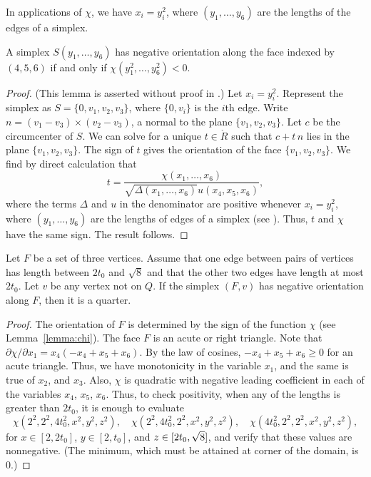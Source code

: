 In applications of $\chi$, we have $x_i = y_i^2$, where
$(y_1,\ldots,y_6)$ are the lengths of the edges of a simplex.

\begin{lemma} \label{lemma:chi}
A  simplex $S(y_1,\ldots,y_6)$ has negative
orientation along the face indexed by $(4,5,6)$ if and only if
    $\chi(y_1^2,\ldots,y_6^2)<0$.
\end{lemma}

\begin{proof} (This lemma is asserted without proof in \cite{part1}.)
Let $x_i = y_i^2$.  Represent the simplex as
$S=\{0,v_1,v_2,v_3\}$, where $\{0,v_i\}$ is the $i$th edge.  Write
$n = (v_1-v_3)\times (v_2-v_3)$, a normal to the plane
$\{v_1,v_2,v_3\}$.   Let $c$ be the circumcenter of $S$. We can
solve for a unique $t\in\ring{R}$ such that $c + t\, n $ lies in
the plane $\{v_1,v_2,v_3\}$.  The sign of $t$ gives the
orientation of the face $\{v_1,v_2,v_3\}$. We find by direct
calculation that
        $$t =
        \frac{\chi(x_1,\ldots,x_6)}{\sqrt{\Delta(x_1,\ldots,x_6)}
        u(x_4,x_5,x_6)},
        $$
where the terms $\Delta$ and $u$ in the denominator are positive
whenever $x_i=y_i^2$, where $(y_1,\ldots,y_6)$ are the lengths of
edges of a simplex (see \cite[Sec.~8.1]{part1}). Thus, $t$ and
$\chi$ have the same sign. The result follows.
\end{proof}



\begin{lemma}
\label{lemma:neg-orient-quad}
Let $F$ be a set of three vertices.  Assume that one edge between
pairs of vertices has length between $2t_0$ and $\sqrt8$ and that
the other two edges have length at most $2t_0$.  Let $v$ be any
vertex not on $Q$. If the simplex $(F,v)$ has negative orientation
along $F$, then it is a quarter.
\end{lemma}

\begin{proof}  The orientation of $F$ is determined by the sign of the function
$\chi$ (see Lemma~\ref{lemma:chi}). The face $F$ is an acute or
right triangle. Note that $\partial\chi/\partial x_1 = x_4
(-x_4+x_5+x_6)$.  By the law of cosines, $-x_4+x_5+x_6\ge0$ for an
acute triangle. Thus, we have monotonicity in the variable $x_1$,
and the same is true of $x_2$, and $x_3$. Also, $\chi$ is
quadratic with negative leading coefficient in each of the
variables $x_4$, $x_5$, $x_6$. Thus, to check positivity, when any
of the lengths is greater than $2t_0$, it is enough to evaluate
$$\chi(2^2,2^2,4t_0^2,x^2,y^2,z^2), \quad
\chi(2^2,4t_0^2,2^2,x^2,y^2,z^2),  \quad
\chi(4t_0^2,2^2,2^2,x^2,y^2,z^2),$$ for $x\in[2,2t_0]$,
$y\in[2,t_0]$, and $z\in[2t_0,\sqrt8]$, and verify that these values
are nonnegative. (The minimum, which must be attained at corner of
the domain, is  $0$.)
\end{proof}

